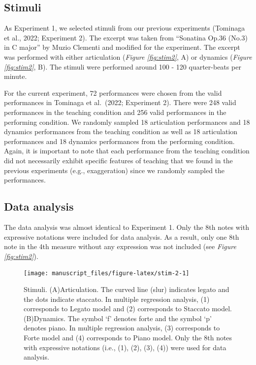 \documentclass[
  man,floatsintext]{apa6}
\begin{document}
\hypertarget{stimuli-1}{%
\subsection{Stimuli}\label{stimuli-1}}

As Experiment 1, we selected stimuli from our previous experiments (Tominaga et al., 2022; Experiment 2). The excerpt was taken from ``Sonatina Op.36 (No.3) in C major'' by Muzio Clementi and modified for the experiment. The excerpt was performed with either articulation (\emph{Figure \ref{fig:stim2}}, A) or dynamics (\emph{Figure \ref{fig:stim2}}, B). The stimuli were performed around 100 - 120 quarter-beats per minute.

For the current experiment, 72 performances were chosen from the valid performances in Tominaga et al.~(2022; Experiment 2). There were 248 valid performances in the teaching condition and 256 valid performances in the performing condition. We randomly sampled 18 articulation performances and 18 dynamics performances from the teaching condition as well as 18 articulation performances and 18 dynamics performances from the performing condition. Again, it is important to note that each performance from the teaching condition did not necessarily exhibit specific features of teaching that we found in the previous experiments (e.g., exaggeration) since we randomly sampled the performances.

\hypertarget{data-analysis-1}{%
\subsection{Data analysis}\label{data-analysis-1}}

The data analysis was almost identical to Experiment 1. Only the 8th notes with expressive notations were included for data analysis. As a result, only one 8th note in the 4th measure without any expression was not included (see \emph{Figure \ref{fig:stim2}}).

\begin{figure}
\texttt{[image: manuscript\_files/figure-latex/stim-2-1]} \caption{\label{fig:stim2}Stimuli. (A)Articulation. The curved line (slur) indicates legato and the dots indicate staccato. In multiple regression analysis, (1) corresponds to Legato model and (2) corresponds to Staccato model. (B)Dynamics. The symbol `f' denotes forte and the symbol `p' denotes piano. In multiple regression analysis, (3) corresponds to Forte model and (4) corresponds to Piano model. Only the 8th notes with expressive notations (i.e., (1), (2), (3), (4)) were used for data analysis.}\label{fig:stim-2}
\end{figure}
\end{document}
